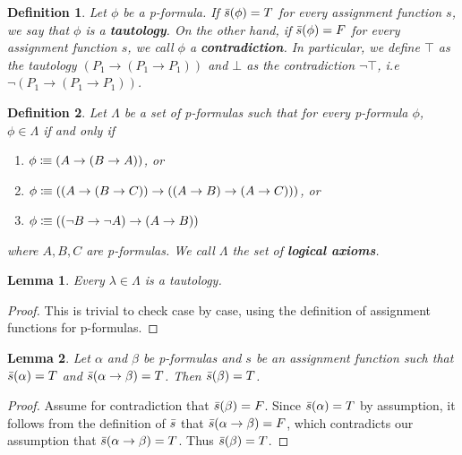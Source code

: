 \documentclass[leqno]{article}
\newtheorem{lemma}{Lemma}[section]
\newtheorem{definition}{Definition}[section]
\newcommand{\is}{\colonequiv}
\newcommand{\limplies}{\rightarrow}
\begin{document}
\begin{definition}
    Let $\phi$ be a p-formula. If $\Bar{s}(\phi) = T$ for every assignment function $s$, we say that $\phi$ is a \textbf{tautology}. On the other hand, if $\Bar{s}(\phi) = F$ for every assignment function $s$, we call $\phi$ a \textbf{contradiction}. In particular, we define $\top$ as the tautology $(P_1 \limplies (P_1 \limplies P_1))$ and $\bot$ as the contradiction $\neg \top$, i.e $\neg (P_1 \limplies (P_1 \limplies P_1))$.
\end{definition}

\begin{definition}
    Let $\Lambda$ be a set of p-formulas such that for every p-formula $\phi$, $\phi \in \Lambda$ if and only if
    
    \begin{enumerate}
        \item $\phi \is (A \limplies (B \limplies A))$, or
        \item $\phi \is ((A \limplies (B \limplies C)) \limplies ((A \limplies B) \limplies (A \limplies C)))$, or
        \item $\phi \is ((\neg B \limplies \neg A) \limplies (A \limplies B))$
    \end{enumerate} where $A,B,C$ are p-formulas. We call $\Lambda$ the set of \textbf{logical axioms}.
\end{definition}

\begin{lemma} \label{lemma_propAxiomsAreTautologies}
    Every $\lambda \in \Lambda$ is a tautology.
\end{lemma}

\begin{proof}
     This is trivial to check case by case, using the definition of assignment functions for p-formulas.
\end{proof}

\begin{lemma} \label{lemma_modusPonens}
    Let $\alpha$ and $\beta$ be p-formulas and $s$ be an assignment function such that $\Bar{s}(\alpha) = T$ and $\Bar{s}(\alpha \limplies \beta) = T$. Then $\Bar{s}(\beta) = T$.
\end{lemma}

\begin{proof}
     Assume for contradiction that $\Bar{s}(\beta) = F$. Since $\Bar{s}(\alpha) = T$ by assumption, it follows from the definition of $\Bar{s}$ that $\Bar{s}(\alpha \limplies \beta) = F$, which contradicts our assumption that $\Bar{s}(\alpha \limplies \beta) = T$. Thus $\Bar{s}(\beta) = T$.
\end{proof}
\end{document}
